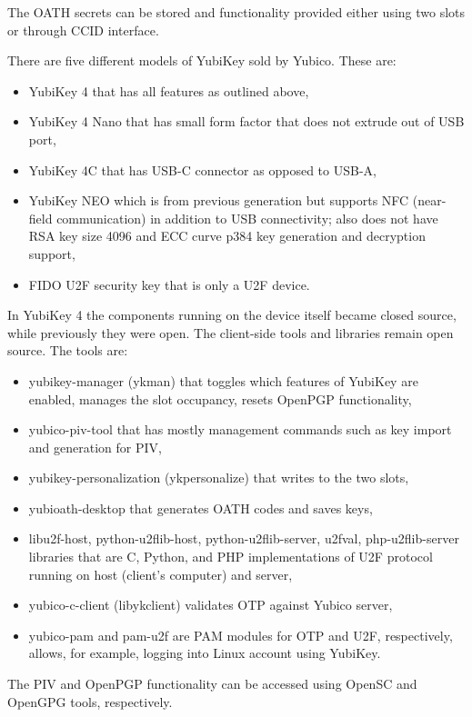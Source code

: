 \documentclass[a4paper]{article}
\begin{document}
The OATH secrets can be stored and functionality provided either using two slots or through CCID interface.

There are five different models of YubiKey sold by Yubico. These are:

\begin{itemize}
	\item YubiKey 4 that has all features as outlined above,
	\item YubiKey 4 Nano that has small form factor that does not extrude out of USB port,
	\item YubiKey 4C that has USB-C connector as opposed to USB-A,
	\item YubiKey NEO which is from previous generation but supports NFC (near-field communication) in addition to USB connectivity; also does not have RSA key size 4096 and ECC curve p384 key generation and decryption support,
	\item FIDO U2F security key that is only a U2F device.
\end{itemize}

In YubiKey 4 the components running on the device itself became closed source, while previously they were open. The client-side tools and libraries remain open source. The tools are:

\begin{itemize}
	\item yubikey-manager (ykman) that toggles which features of YubiKey are enabled, manages the slot occupancy, resets OpenPGP functionality,
	\item yubico-piv-tool that has mostly management commands such as key import and generation for PIV,
	\item yubikey-personalization (ykpersonalize) that writes to the two slots,
	\item yubioath-desktop that generates OATH codes and saves keys,
	\item libu2f-host, python-u2flib-host, python-u2flib-server, u2fval, php-u2flib-server libraries that are C, Python, and PHP implementations of U2F protocol running on host (client's computer) and server,
	\item yubico-c-client (libykclient) validates OTP against Yubico server,
	\item yubico-pam and pam-u2f are PAM modules for OTP and U2F, respectively, allows, for example, logging into Linux account using YubiKey.
\end{itemize}

The PIV and OpenPGP functionality can be accessed using OpenSC and OpenGPG tools, respectively.
\end{document}
